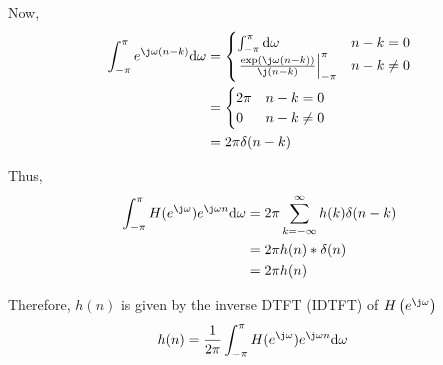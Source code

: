 \documentclass[journal,12pt,twocolumn]{IEEEtran}
\providecommand{\brak}[1]{\ensuremath{\left(#1\right)}}
\providecommand{\der}[1]{\mathrm{d} #1}
\numberwithin{equation}{section}
\renewcommand\thesection{\arabic{section}}
\begin{document}
\begin{enumerate}[label=\thesection.\arabic*]
	Now,
	\begin{align}
		 \int_{-\pi}^{\pi} e^{\j\omega(n-k)} \der{\omega} 
		 &= \begin{cases}
		 	\int_{-\pi}^\pi \der{\omega} & n-k = 0 \\
		 	\left.\frac{\exp\brak{\j\omega(n-k)}}{\j(n-k)}\right|_{-\pi}^\pi & n-k \ne 0
		 \end{cases} \\		 
		 &= \begin{cases}
		 	2\pi & n-k = 0 \\
		 	0 & n-k \ne 0
		 \end{cases} \\
		 &= 2\pi \delta(n-k)
	\end{align}
	
	Thus,
	\begin{align}
		\int_{-\pi}^{\pi} H(e^{\j\omega}) e^{\j\omega n} \der{\omega} &= 2\pi\sum_{k=-\infty}^\infty h(k) \delta(n-k) \\
		&= 2\pi h(n) * \delta(n) \\
		&= 2\pi h(n)
	\end{align}
	
	Therefore, $h(n)$ is given by the inverse DTFT (IDTFT) of $H\brak{e^{\j\omega}}$
	\begin{align}
		h(n) &= \frac{1}{2\pi} \int_{-\pi}^{\pi} H(e^{\j\omega}) e^{\j\omega n} \der{\omega} 
	\end{align}
	
	\end{enumerate}
	
\end{document}
